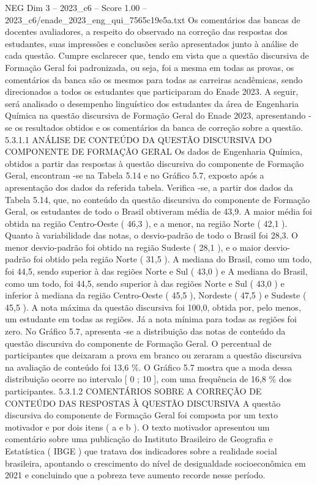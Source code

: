 \begin{textsample}{NEG Dim 3 – 2023\_c6 – Score 1.00 – 2023\_c6/enade\_2023\_eng\_qui\_7565c19e5a.txt}
Os comentários das bancas de docentes avaliadores, a respeito do observado na correção das respostas dos estudantes, suas impressões e conclusões serão apresentados junto à análise de cada questão.
Cumpre esclarecer que, tendo em vista que a questão discursiva de Formação Geral foi padronizada, ou seja, foi a mesma em todas as provas, os comentários da banca são os mesmos para todas as carreiras acadêmicas, sendo direcionados a todos os estudantes que participaram do Enade 2023.
A seguir, será analisado o desempenho linguístico dos estudantes da área de Engenharia Química na questão discursiva de Formação Geral do Enade 2023, apresentando -se os resultados obtidos e os comentários da banca de correção sobre a questão. 5.3.1.1 ANÁLISE DE CONTEÚDO DA QUESTÃO DISCURSIVA DO COMPONENTE DE FORMAÇÃO GERAL Os dados de Engenharia Química, obtidos a partir das respostas à questão discursiva do componente de Formação Geral, encontram -se na Tabela 5.14 e no Gráfico 5.7, exposto após a apresentação dos dados da referida tabela.
Verifica -se, a partir dos dados da Tabela 5.14, que, no conteúdo da questão discursiva do componente de Formação Geral, os estudantes de todo o Brasil obtiveram média de 43,9.
A maior média foi obtida na região Centro-Oeste ( 46,3 ), e a menor, na região Norte ( 42,1 ).
Quanto à variabilidade das notas, o desvio-padrão de todo o Brasil foi 28,3.
O menor desvio-padrão foi obtido na região Sudeste ( 28,1 ), e o maior desvio-padrão foi obtido pela região Norte ( 31,5 ).
A mediana do Brasil, como um todo, foi 44,5, sendo superior à das regiões Norte e Sul ( 43,0 ) e A mediana do Brasil, como um todo, foi 44,5, sendo superior à das regiões Norte e Sul ( 43,0 ) e inferior à mediana da região Centro-Oeste ( 45,5 ), Nordeste ( 47,5 ) e Sudeste ( 45,5 ).
A nota máxima da questão discursiva foi 100,0, obtida por, pelo menos, um estudante em todas as regiões.
Já a nota mínima para todas as regiões foi zero.
No Gráfico 5.7, apresenta -se a distribuição das notas de conteúdo da questão discursiva do componente de Formação Geral.
O percentual de participantes que deixaram a prova em branco ou zeraram a questão discursiva na avaliação de conteúdo foi 13,6 \%.
O Gráfico 5.7 mostra que a moda dessa distribuição ocorre no intervalo [ 0 ; 10 ], com uma frequência de 16,8 \% dos participantes. 5.3.1.2 COMENTÁRIOS SOBRE A CORREÇÃO DE CONTEÚDO DAS RESPOSTAS À QUESTÃO DISCURSIVA A questão discursiva do componente de Formação Geral foi composta por um texto motivador e por dois itens ( a e b ).
O texto motivador apresentou um comentário sobre uma publicação do Instituto Brasileiro de Geografia e Estatística ( IBGE ) que tratava dos indicadores sobre a realidade social brasileira, apontando o crescimento do nível de desigualdade socioeconômica em 2021 e concluindo que a pobreza teve aumento recorde nesse período.

\end{textsample}

